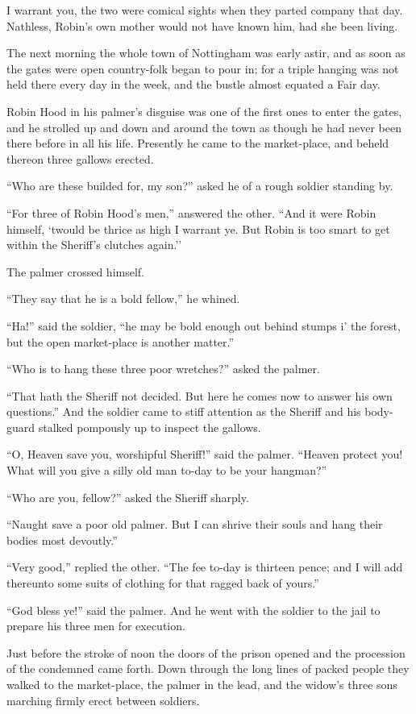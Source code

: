 I warrant you, the two were comical sights when they parted company that
day. Nathless, Robin's own mother would not have known him, had she been
living.

The next morning the whole town of Nottingham was early astir, and as
soon as the gates were open country-folk began to pour in; for a triple
hanging was not held there every day in the week, and the bustle almost
equated a Fair day.

Robin Hood in his palmer's disguise was one of the first ones to enter
the gates, and he strolled up and down and around the town as though he
had never been there before in all his life. Presently he came to the
market-place, and beheld thereon three gallows erected.

``Who are these builded for, my son?'' asked he of a rough soldier
standing by.

``For three of Robin Hood's men,'' answered the other. ``And it were
Robin himself, `twould be thrice as high I warrant ye. But Robin is too
smart to get within the Sheriff's clutches again.''

The palmer crossed himself.

``They say that he is a bold fellow,'' he whined.

``Ha!'' said the soldier, ``he may be bold enough out behind stumps i'
the forest, but the open market-place is another matter.''

``Who is to hang these three poor wretches?'' asked the palmer.

``That hath the Sheriff not decided. But here he comes now to answer his
own questions.'' And the soldier came to stiff attention as the Sheriff
and his body-guard stalked pompously up to inspect the gallows.

``O, Heaven save you, worshipful Sheriff!'' said the palmer. ``Heaven
protect you! What will you give a silly old man to-day to be your
hangman?''

``Who are you, fellow?'' asked the Sheriff sharply.

``Naught save a poor old palmer. But I can shrive their souls and hang
their bodies most devoutly.''

``Very good,'' replied the other. ``The fee to-day is thirteen pence;
and I will add thereunto some suits of clothing for that ragged back of
yours.''

``God bless ye!'' said the palmer. And he went with the soldier to the
jail to prepare his three men for execution.

Just before the stroke of noon the doors of the prison opened and the
procession of the condemned came forth. Down through the long lines of
packed people they walked to the market-place, the palmer in the lead,
and the widow's three sons marching firmly erect between soldiers.


